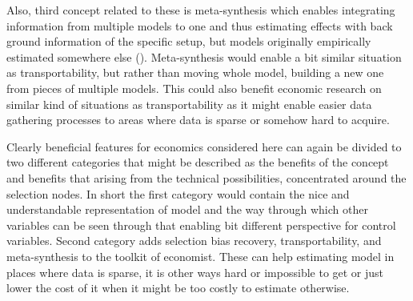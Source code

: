 \documentclass[main=english,12pt,a4paper,pdftex,econ,utf8]{aaltothesis}
\begin{document}
Also, third concept related to these is meta-synthesis which enables integrating information from multiple models to one and thus estimating effects with back ground information of the specific setup, but models originally empirically estimated somewhere else (\cite{Pearl2012a}). Meta-synthesis would enable a bit similar situation as transportability, but rather than moving whole model, building a new one from pieces of multiple models. This could also benefit economic research on similar kind of situations as transportability as it might enable easier data gathering processes to areas where data is sparse or somehow hard to acquire.

Clearly beneficial features for economics considered here can again be divided to two different categories that might be described as the benefits of the concept and benefits that arising from the technical possibilities, concentrated around the selection nodes. In short the first category would contain the nice and understandable representation of model and the way through which other variables can be seen through that enabling bit different perspective for control variables. Second category adds selection bias recovery, transportability, and meta-synthesis to the toolkit of economist. These can help estimating model in places where data is sparse, it is other ways hard or impossible to get or just lower the cost of it when it might be too costly to estimate otherwise.

\begin{comment}
\hl{These} would enable using once done model in some place that must have same causal structure, but there might be some factors affecting the estimates differing from the original location to be used also in the second place. This would of course be again highly useful for economics and as selection recovery this might make implementing models for different settings much cheaper and thus also possible in smaller settings which might enable better policy recommendation and better decision making for smaller units such as municipalities. Also some complicated questions like how the social security system should be renewed in could be assessed more carefully with perhaps some research done in fairly similar setting in other country. Even thought this seems very promising and usable this is of course no silver bullet solving every problem. Even though there might be interesting use cases this requires the causal structure being exactly same to retain the causal interpretation and exactly same causal structures are of course in real world very hard to find.
\end{comment}
\end{document}
